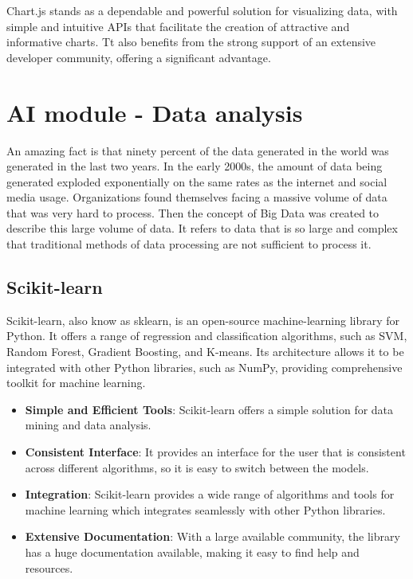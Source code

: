 Chart.js stands as a dependable and powerful solution for visualizing data, with simple and intuitive APIs that facilitate the creation of attractive and
informative charts. Tt also benefits from the strong support of an extensive developer community, offering a significant advantage.


\section{AI module - Data analysis}

An amazing fact is that ninety percent of the data generated in the world was generated in the last two years. In the early 2000s, the amount of data being
generated exploded exponentially on the same rates as the internet and social media usage. Organizations found themselves facing a massive volume of data 
that was very hard to process. Then the concept of Big Data was created to describe this large volume of data. It refers to data that is so large and complex
that traditional methods of data processing are not sufficient to process it. \cite{bigdata}


\subsection{Scikit-learn}

Scikit-learn, also know as sklearn, is an open-source machine-learning library for Python. It offers a range of regression and classification algorithms,
such as SVM, Random Forest, Gradient Boosting, and K-means. Its architecture allows it to be integrated with other Python libraries, such as NumPy, providing 
comprehensive toolkit for machine learning. \cite{scikit}

\begin{itemize}
    \item \textbf{Simple and Efficient Tools}: Scikit-learn offers a simple solution for data mining and data analysis.
    \item \textbf{Consistent Interface}: It provides an interface for the user that is consistent across different algorithms, so it is easy to switch between the models.
    \item \textbf{Integration}: Scikit-learn provides a wide range of algorithms and tools for machine learning which integrates seamlessly with other Python libraries.
    \item \textbf{Extensive Documentation}: With a large available community, the library has a huge documentation available, making it easy to find help and resources.
\end{itemize}

